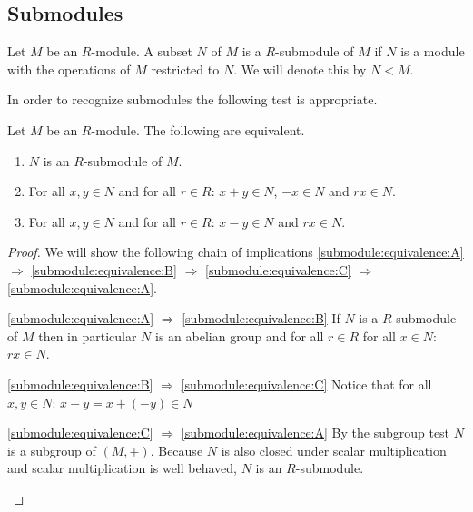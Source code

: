 \subsection{Submodules}

\begin{definition}
	Let $M$ be an $R$-module. A subset $N$ of $M$ is a $R$-submodule of $M$
	if $N$ is a module with the operations of $M$ restricted to $N$. We will
	denote this by $N<M$.
\end{definition}

In order to recognize submodules the following test is appropriate.

\begin{proposition}
	Let $M$ be an $R$-module. The following are equivalent.
	\begin{enumerate}
		\item\label{submodule:equivalence:A} $N$ is an $R$-submodule of
		$M$. 
		
		\item\label{submodule:equivalence:B} For all $x,y\in N$ and for
		all $r\in R$: $x+y\in N$, $-x\in N$ and $rx\in N$.
		
		\item\label{submodule:equivalence:C} For all $x,y\in N$ and for
		all $r\in R$: $x-y\in N$ and $rx\in N$.
	\end{enumerate}	
\end{proposition}

\begin{proof}
	We will show the following chain of implications
	\ref{submodule:equivalence:A} $\Rightarrow$
	\ref{submodule:equivalence:B} $\Rightarrow$
	\ref{submodule:equivalence:C} $\Rightarrow$
	\ref{submodule:equivalence:A}.
	
	\begin{namedlist}[\ref{submodule:equivalence:A} $\Rightarrow$ \ref{submodule:equivalence:B}]
		\item[\ref{submodule:equivalence:A} $\Rightarrow$ \ref{submodule:equivalence:B}]
		If $N$ is a $R$-submodule of $M$ then in particular $N$ is an
		abelian group and for all $r\in R$ for all $x\in N$: $rx\in N$.
				
		\item[\ref{submodule:equivalence:B} $\Rightarrow$ \ref{submodule:equivalence:C}]
		Notice that for all $x,y\in N$: $x-y = x + (-y) \in N$
		
		\item[\ref{submodule:equivalence:C} $\Rightarrow$ \ref{submodule:equivalence:A}]
		By the subgroup test $N$ is a subgroup of $(M,+)$. Because $N$
		is also closed under scalar multiplication and scalar
		multiplication is well behaved, $N$ is an $R$-submodule.
	\end{namedlist}
\end{proof}

